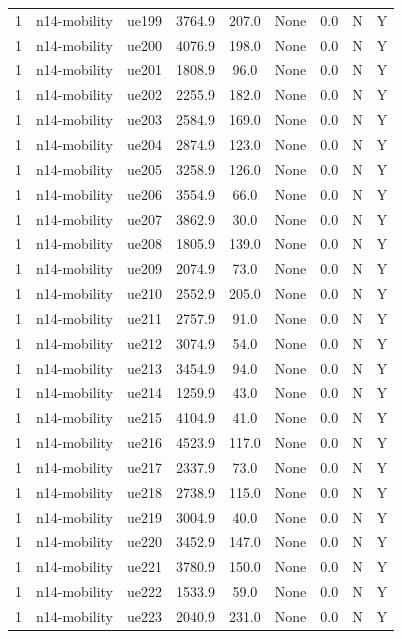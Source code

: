 \begin{table}[ht]
\begin{tabular}{|c|c|c|c|c|c|c|c|c|}
1 & n14-mobility & ue199 & 3764.9 & 207.0 & None & 0.0 & N & Y \\
1 & n14-mobility & ue200 & 4076.9 & 198.0 & None & 0.0 & N & Y \\
1 & n14-mobility & ue201 & 1808.9 & 96.0 & None & 0.0 & N & Y \\
1 & n14-mobility & ue202 & 2255.9 & 182.0 & None & 0.0 & N & Y \\
1 & n14-mobility & ue203 & 2584.9 & 169.0 & None & 0.0 & N & Y \\
1 & n14-mobility & ue204 & 2874.9 & 123.0 & None & 0.0 & N & Y \\
1 & n14-mobility & ue205 & 3258.9 & 126.0 & None & 0.0 & N & Y \\
1 & n14-mobility & ue206 & 3554.9 & 66.0 & None & 0.0 & N & Y \\
1 & n14-mobility & ue207 & 3862.9 & 30.0 & None & 0.0 & N & Y \\
1 & n14-mobility & ue208 & 1805.9 & 139.0 & None & 0.0 & N & Y \\
1 & n14-mobility & ue209 & 2074.9 & 73.0 & None & 0.0 & N & Y \\
1 & n14-mobility & ue210 & 2552.9 & 205.0 & None & 0.0 & N & Y \\
1 & n14-mobility & ue211 & 2757.9 & 91.0 & None & 0.0 & N & Y \\
1 & n14-mobility & ue212 & 3074.9 & 54.0 & None & 0.0 & N & Y \\
1 & n14-mobility & ue213 & 3454.9 & 94.0 & None & 0.0 & N & Y \\
1 & n14-mobility & ue214 & 1259.9 & 43.0 & None & 0.0 & N & Y \\
1 & n14-mobility & ue215 & 4104.9 & 41.0 & None & 0.0 & N & Y \\
1 & n14-mobility & ue216 & 4523.9 & 117.0 & None & 0.0 & N & Y \\
1 & n14-mobility & ue217 & 2337.9 & 73.0 & None & 0.0 & N & Y \\
1 & n14-mobility & ue218 & 2738.9 & 115.0 & None & 0.0 & N & Y \\
1 & n14-mobility & ue219 & 3004.9 & 40.0 & None & 0.0 & N & Y \\
1 & n14-mobility & ue220 & 3452.9 & 147.0 & None & 0.0 & N & Y \\
1 & n14-mobility & ue221 & 3780.9 & 150.0 & None & 0.0 & N & Y \\
1 & n14-mobility & ue222 & 1533.9 & 59.0 & None & 0.0 & N & Y \\
1 & n14-mobility & ue223 & 2040.9 & 231.0 & None & 0.0 & N & Y \\

\end{tabular}
\end{table}
